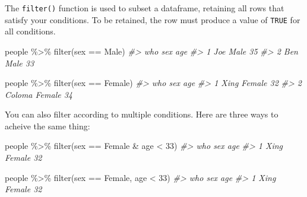 \documentclass[
]{book}
\newenvironment{Shaded}{\begin{snugshade}}{\end{snugshade}}
\newcommand{\CommentTok}[1]{\textcolor[rgb]{0.56,0.35,0.01}{\textit{#1}}}
\newcommand{\DecValTok}[1]{\textcolor[rgb]{0.00,0.00,0.81}{#1}}
\newcommand{\FunctionTok}[1]{\textcolor[rgb]{0.00,0.00,0.00}{#1}}
\newcommand{\NormalTok}[1]{#1}
\newcommand{\SpecialCharTok}[1]{\textcolor[rgb]{0.00,0.00,0.00}{#1}}
\newcommand{\StringTok}[1]{\textcolor[rgb]{0.31,0.60,0.02}{#1}}
\begin{document}
The \texttt{filter()} function is used to subset a dataframe, retaining all rows that satisfy your conditions. To be retained, the row must produce a value of \texttt{TRUE} for all conditions.

\begin{Shaded}
\begin{Highlighting}[]
\NormalTok{people }\SpecialCharTok{\%\textgreater{}\%} \FunctionTok{filter}\NormalTok{(sex }\SpecialCharTok{==} \StringTok{\textquotesingle{}Male\textquotesingle{}}\NormalTok{)}
\CommentTok{\#\textgreater{}   who  sex age}
\CommentTok{\#\textgreater{} 1 Joe Male  35}
\CommentTok{\#\textgreater{} 2 Ben Male  33}
\end{Highlighting}
\end{Shaded}

\begin{Shaded}
\begin{Highlighting}[]
\NormalTok{people }\SpecialCharTok{\%\textgreater{}\%} \FunctionTok{filter}\NormalTok{(sex }\SpecialCharTok{==} \StringTok{\textquotesingle{}Female\textquotesingle{}}\NormalTok{)}
\CommentTok{\#\textgreater{}      who    sex age}
\CommentTok{\#\textgreater{} 1   Xing Female  32}
\CommentTok{\#\textgreater{} 2 Coloma Female  34}
\end{Highlighting}
\end{Shaded}

You can also filter according to multiple conditions. Here are three ways to acheive the same thing:

\begin{Shaded}
\begin{Highlighting}[]
\NormalTok{people }\SpecialCharTok{\%\textgreater{}\%} \FunctionTok{filter}\NormalTok{(sex }\SpecialCharTok{==} \StringTok{\textquotesingle{}Female\textquotesingle{}} \SpecialCharTok{\&}\NormalTok{ age }\SpecialCharTok{\textless{}} \DecValTok{33}\NormalTok{)}
\CommentTok{\#\textgreater{}    who    sex age}
\CommentTok{\#\textgreater{} 1 Xing Female  32}
\end{Highlighting}
\end{Shaded}

\begin{Shaded}
\begin{Highlighting}[]
\NormalTok{people }\SpecialCharTok{\%\textgreater{}\%} \FunctionTok{filter}\NormalTok{(sex }\SpecialCharTok{==} \StringTok{\textquotesingle{}Female\textquotesingle{}}\NormalTok{, age }\SpecialCharTok{\textless{}} \DecValTok{33}\NormalTok{)}
\CommentTok{\#\textgreater{}    who    sex age}
\CommentTok{\#\textgreater{} 1 Xing Female  32}
\end{Highlighting}
\end{Shaded}
\end{document}
